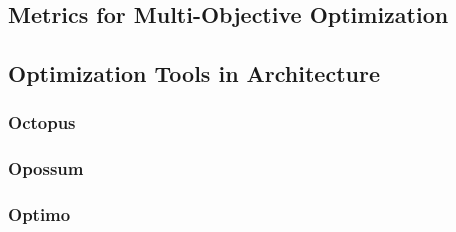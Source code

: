 \subsection{Metrics for Multi-Objective Optimization}

\subsection{Optimization Tools in Architecture}

\subsubsection{Octopus}
\subsubsection{Opossum}
\subsubsection{Optimo}
